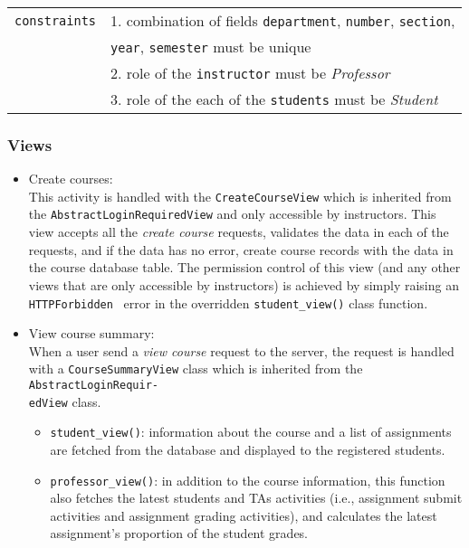 \begin{table}[H]
\begin{tabular}[ht]{r|l}
        \texttt{constraints} & 
            1. combination of fields
                \texttt{department},
                \texttt{number},
                \texttt{section}, \\ &
                \hspace{1.3em}\texttt{year},
                \texttt{semester} must be unique \\
            & 2. role of the \texttt{instructor} must be \emph{Professor} \\
            & 3. role of the each of the \texttt{students} must be \emph{Student} \\
        \hline
    \end{tabular}
    \renewcommand{\arraystretch}{1}
    
\end{table}

\subsubsection{Views}

\begin{itemize}
    \item Create courses: \\
    \label{item:NEW_COURSE}
        This activity is handled with the \texttt{CreateCourseView} which is
        inherited from the \texttt{AbstractLoginRequiredView} and 
        only accessible by instructors. 
        This view accepts all the \emph{create course} requests, validates the
        data in each of the requests, and if the data has no error,
        create course records with the data in the course database table.
        The permission control of this view
        (and any other views that are only accessible by instructors) is
        achieved by simply raising an \texttt{HTTPForbidden}~\citep[Section 6.5.3]{http}
        error in the overridden \texttt{student\_view()} class function.
    
    \item View course summary:\\
    When a user send a \emph{view course} request to the server, the request
    is handled with a \texttt{CourseSummaryView} class which is inherited from
    the \texttt{AbstractLoginRequir-\\edView} class.
    \begin{itemize}
        \item \texttt{student\_view()}: 
            information about the course and a list of assignments
            are fetched from the database and displayed to the registered
            students.
        \item \texttt{professor\_view()}:
            in addition to the course information,
            this function also fetches the latest students and TAs activities 
            (i.e., assignment submit activities and  assignment grading
            activities),
            and calculates the latest assignment's proportion of the student
            grades.
    \end{itemize}
\end{itemize}

